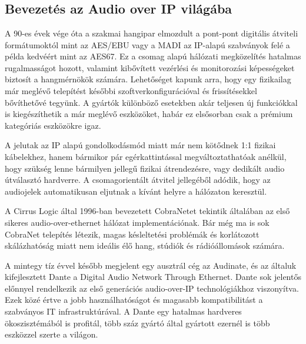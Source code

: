 \chapter{\AudioOverIp}
\section{Bevezetés az Audio over IP világába~\cite{AHNERT2023}}
A 90-es évek vége óta a szakmai hangipar elmozdult a pont-pont digitális
átviteli formátumoktól mint az AES/EBU vagy a MADI az IP-alapú szabványok felé a példa kedvéért mint az AES67. 
Ez a csomag alapú hálózati megközelítés hatalmas rugalmasságot
hozott, valamint kibővített vezérlési és monitorozási képességeket biztosít a
hangmérnökök számára. Lehetőséget kapunk arra, hogy egy fizikailag már meglévő
telepítést későbbi szoftverkonfigurációval és frissítésekkel bővíthetővé tegyünk.
A gyártók különböző esetekben akár teljesen új funkciókkal is kiegészíthetik a már meglévő eszközöket,
habár ez elsősorban csak a prémium kategóriás eszközökre igaz.

A jelutak az IP alapú gondolkodásmód miatt már nem kötődnek 1:1 fizikai kábelekhez, hanem
bármikor pár egérkattintással megváltoztathatóak anélkül, hogy szükség lenne bármilyen
jellegű fizikai átrendezésre, vagy dedikált audio útválasztó hardverre. 
A csomagorientált átvitel jellegéből adódik, hogy az audiojelek automatikusan eljutnak 
a kívánt helyre a hálózaton keresztül.

A Cirrus Logic által 1996-ban bevezetett CobraNetet
tekintik általában az első sikeres audio-over-ethernet hálózat implementációnak.
Bár még ma is sok CobraNet telepítés létezik, magas késleltetési problémák és korlátozott skálázhatóság
miatt nem ideális élő hang, stúdiók és rádióállomások számára.

A mintegy tíz évvel később megjelent egy ausztrál cég az Audinate, és az általuk kifejlesztett
Dante a Digital Audio Network Through Ethernet. Dante sok jelentős
előnnyel rendelkezik az első generációs audio-over-IP technológiákhoz viszonyítva.
Ezek közé értve a jobb használhatóságot és magasabb kompatibilitást a szabványos
IT infrastruktúrával. A Dante egy hatalmas hardveres ökoszisztémából is profitál, 
több száz gyártó által gyártott ezernél is több eszközzel szerte a világon.

